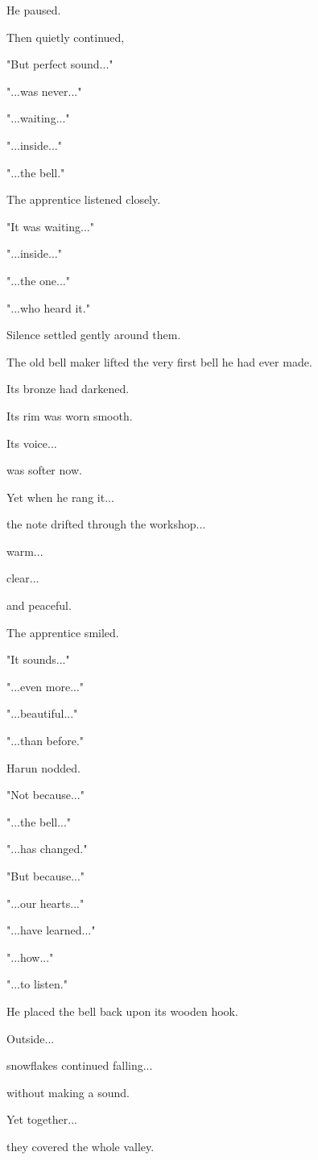 \documentclass[12pt,openany]{book}
\begin{document}
He paused.

Then quietly continued,

"But perfect sound..."

"...was never..."

"...waiting..."

"...inside..."

"...the bell."

The apprentice listened closely.

"It was waiting..."

"...inside..."

"...the one..."

"...who heard it."

Silence settled gently around them.

The old bell maker lifted the very first bell he had ever made.

Its bronze had darkened.

Its rim was worn smooth.

Its voice...

was softer now.

Yet when he rang it...

the note drifted through the workshop...

warm...

clear...

and peaceful.

The apprentice smiled.

"It sounds..."

"...even more..."

"...beautiful..."

"...than before."

Harun nodded.

"Not because..."

"...the bell..."

"...has changed."

"But because..."

"...our hearts..."

"...have learned..."

"...how..."

"...to listen."

He placed the bell back upon its wooden hook.

Outside...

snowflakes continued falling...

without making a sound.

Yet together...

they covered the whole valley.
\end{document}
